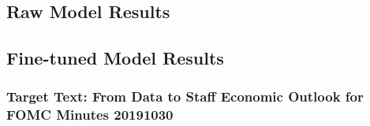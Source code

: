 \subsection{Raw Model Results}





\subsection{Fine-tuned Model Results}

\subsubsection{Target Text: From Data to Staff Economic Outlook for FOMC Minutes 20191030}\label{target_text}

